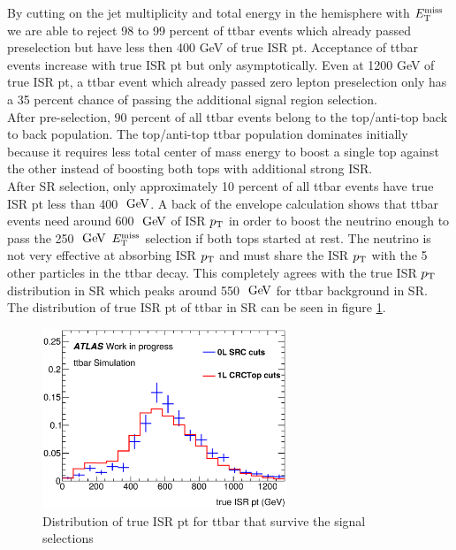 \indent By cutting on the jet multiplicity and total energy in the hemisphere with $E_{\mathrm{T}}^{\mathrm{miss}}$ we are able to reject 98 to 99 percent of ttbar events which already passed preselection but have less then 400 GeV of true ISR pt.  Acceptance of ttbar events increase with true ISR pt but only asymptotically.  Even at 1200 GeV of true ISR pt, a ttbar event which already passed zero lepton preselection only has a 35 percent chance of passing the additional signal region selection.  \\

\indent  After pre-selection, 90 percent of all ttbar events belong to the top/anti-top back to back population.  The top/anti-top ttbar population dominates initially because it requires less total center of mass energy to boost a single top against the other instead of boosting both tops with additional strong ISR.  \\

\indent After SR selection, only approximately 10 percent of all ttbar events have true ISR pt less than 400 $\gev$.  A back of the envelope calculation shows that ttbar events need around 600 $\gev$ of ISR $p_{\mathrm{T}}$ in order to boost the neutrino enough to pass the 250 $\gev$ $E_{\mathrm{T}}^{\mathrm{miss}}$ selection if both tops started at rest.  The neutrino is not very effective at absorbing ISR $p_{\mathrm{T}}$ and must share the ISR $p_{\mathrm{T}}$ with the 5 other particles in the ttbar decay.  This completely agrees with the true ISR $p_{\mathrm{T}}$ distribution in SR which peaks around 550 $\gev$ for ttbar background in SR.  The distribution of true ISR pt of ttbar in SR can be seen in figure \ref{fig:ttbar:SR:trueISRpt}.  \\

\begin{figure}[h!]
  \centering
	\includegraphics[width=0.65\textwidth]{./figures/ttbar/truePtISR_SRC_CRC_compare.eps}
\caption{\label{fig:ttbar:SR:trueISRpt}{Distribution of true ISR pt for ttbar that survive the signal selections}}
\end{figure}

